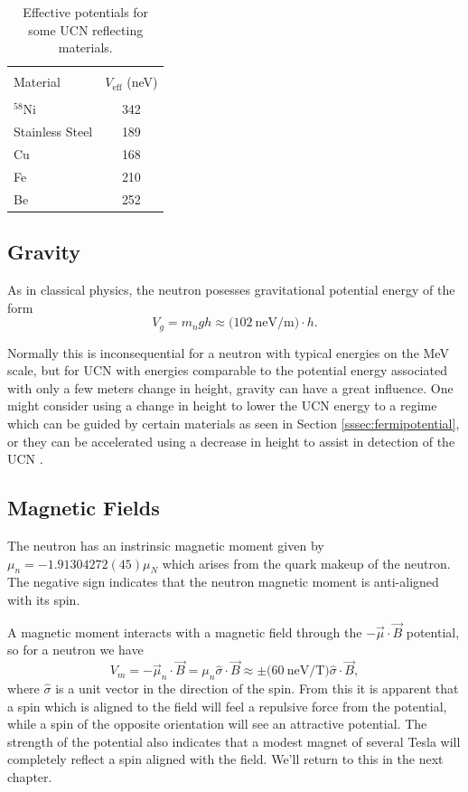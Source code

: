 \begin{table}[h]
  \caption{Effective potentials for some UCN reflecting materials.} 
  \centering
  \begin{tabular}{l c }
    \hline \\ [-1.75ex]
    Material & $V_{\mathrm{eff}}$ (neV) \\
    \hline \hline \\ [-1.75ex]
    $^{58}\mathrm{Ni}$ & 342 \\
    Stainless Steel & 189 \\
    Cu & 168 \\
    Fe & 210 \\
    Be & 252 \\
    \hline
  \end{tabular}
  \label{tab:fermipotential}
\end{table}


\subsection{Gravity}

As in classical physics, the neutron posesses gravitational potential energy of the form
%
\begin{equation}
  V_g = m_ngh \approx \big(102 \mathrm{~neV/m}\big) \cdot h.
\end{equation}

Normally this is inconsequential for a neutron with typical energies on the MeV scale,
but for UCN with energies comparable to the potential energy associated with only a few
meters change in height, gravity can have a great influence. One might consider using
a change in height to lower the UCN energy to a regime which can be guided by certain
materials as seen in Section \ref{sssec:fermipotential}, or they can be accelerated using
a decrease in height to assist in detection of the UCN \cite{golub1991ultra}.

\subsection{Magnetic Fields}

The neutron has an instrinsic magnetic moment given by
${\mu}_n = -1.91304272(45){\mu}_N$ \cite{pdg} which arises from the quark makeup of the neutron.
The negative sign indicates that the neutron magnetic moment is anti-aligned with its spin.

A magnetic moment interacts with a magnetic field through the $-\vec{\mu} \cdot \vec{B}$ potential, so for
a neutron we have
%
\begin{equation}
  V_m = -\vec{\mu}_n \cdot \vec{B} = \mu_n \hat{\sigma} \cdot \vec{B} \approx \pm \big(60 \mathrm{~neV/T}\big)
  \hat{\sigma} \cdot \vec{B}, 
\end{equation}
where $\hat{\sigma}$ is a unit vector in the direction of the spin. From this it is apparent that a spin which is
aligned to the field will feel a repulsive force from the potential, while a spin of the opposite orientation
will see an attractive potential. The strength of the potential also indicates that a modest magnet of several
Tesla will completely reflect a spin aligned with the field. We'll return to this in the next chapter.


